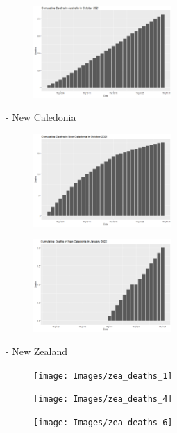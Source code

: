 \documentclass[a4paper]{article}
\theoremstyle{definition}
\begin{document}
\begin{enumerate}[i)]
\begin{enumerate}[1)]
		\begin{figure} [!htp]
  		\centering
  		\includegraphics [width=0.47\textwidth] {Images/aus_deaths_8}
		\end{figure}
	- New Caledonia\\
		\begin{figure} [!htp]
  		\centering
  		\includegraphics [width=0.47\textwidth] {Images/cal_deaths_2}
		\end{figure}
		
		\begin{figure} [!htp]
  		\centering
  		\includegraphics [width=0.47\textwidth] {Images/cal_deaths_1}
		\end{figure}
	- New Zealand\\
		\begin{figure} [!htp]
  		\centering
  		\texttt{[image: Images/zea\_deaths\_1]}
		\end{figure}
		
		\begin{figure} [!htp]
  		\centering
  		\texttt{[image: Images/zea\_deaths\_4]}
		\end{figure}
		
		\begin{figure} [!htp]
  		\centering
  		\texttt{[image: Images/zea\_deaths\_6]}
		\end{figure}
		

\end{enumerate}
\end{enumerate}
\end{document}
